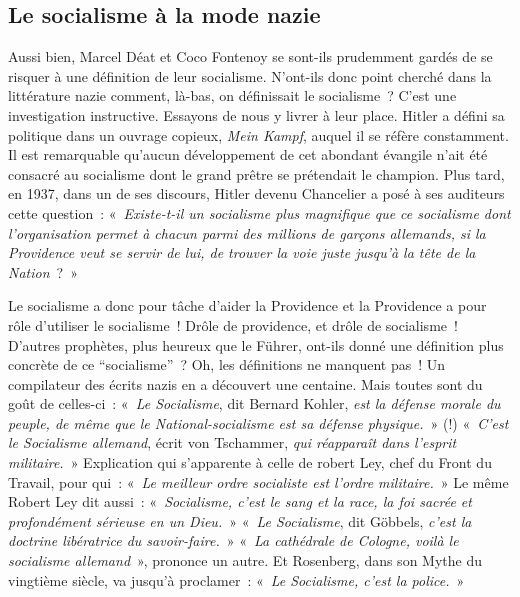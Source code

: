 \documentclass[french,twoside]{book} %
\begin{document}
\subsection[Le socialisme à la mode nazie]{Le socialisme à la mode nazie}
\noindent Aussi bien, Marcel Déat et Coco Fontenoy se sont-ils prudemment gardés de se risquer à une définition de leur   socialisme. N’ont-ils donc point cherché dans la littérature nazie comment, là-bas, on définissait le socialisme ? C’est une investigation instructive. Essayons de nous y livrer à leur place. Hitler a défini sa politique dans un ouvrage copieux, \emph{Mein Kampf}, auquel il se réfère constamment. Il est remarquable qu’aucun développement de cet abondant évangile n’ait été consacré au socialisme dont le grand prêtre se prétendait le champion. Plus tard, en 1937, dans un de ses discours, Hitler devenu Chancelier a posé à ses auditeurs cette question : « \emph{Existe-t-il un socialisme plus magnifique que ce socialisme dont l’organisation permet à chacun parmi des millions de garçons allemands, si la Providence veut se servir de lui, de trouver la voie juste jusqu’à la tête de la Nation} ? »\par
Le socialisme a donc pour tâche d’aider la Providence et la Providence a pour rôle d’utiliser le socialisme ! Drôle de providence, et drôle de socialisme ! D’autres prophètes, plus heureux que le Führer, ont-ils donné une définition plus concrète de ce “socialisme” ? Oh, les définitions ne manquent pas ! Un compilateur des écrits nazis en a découvert une centaine. Mais toutes sont du goût de celles-ci : « \emph{Le Socialisme}, dit Bernard Kohler, \emph{est la défense morale du peuple, de même que le National-socialisme est sa défense physique.} » (!) « \emph{C’est le Socialisme allemand}, écrit von Tschammer, \emph{qui réapparaît dans l’esprit militaire.} » Explication qui s’apparente à celle de robert Ley, chef du Front du Travail, pour qui : « \emph{Le meilleur ordre socialiste est l’ordre militaire.} » Le même Robert Ley dit aussi : « \emph{Socialisme, c’est le sang et la race, la foi sacrée et profondément sérieuse en un Dieu.} » « \emph{Le Socialisme}, dit Göbbels, \emph{c’est la doctrine libératrice du savoir-faire.} » « \emph{La cathédrale de Cologne, voilà le socialisme allemand} », prononce un autre. Et Rosenberg, dans son Mythe du vingtième siècle, va jusqu’à proclamer : « \emph{Le Socialisme, c’est la police.} »\par
\end{document}
